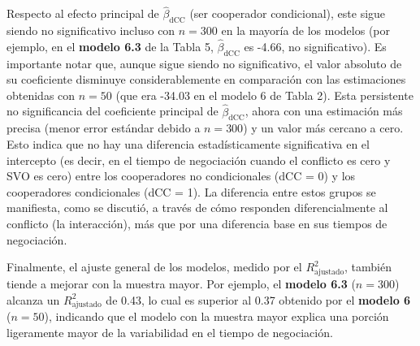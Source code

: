 \documentclass[
  spanish,
  10pt,
]{article}
\begin{document}
Respecto al efecto principal de \(\hat{\beta}_{\text{dCC}}\) (ser
cooperador condicional), este sigue siendo no significativo incluso con
\(n=300\) en la mayoría de los modelos (por ejemplo, en el
\textbf{modelo 6.3} de la Tabla 5, \(\hat{\beta}_{\text{dCC}}\) es
-4.66, no significativo). Es importante notar que, aunque sigue siendo
no significativo, el valor absoluto de su coeficiente disminuye
considerablemente en comparación con las estimaciones obtenidas con
\(n=50\) (que era -34.03 en el modelo 6 de Tabla 2). Esta persistente no
significancia del coeficiente principal de \(\hat{\beta}_{\text{dCC}}\),
ahora con una estimación más precisa (menor error estándar debido a
\(n=300\)) y un valor más cercano a cero. Esto indica que no hay una
diferencia estadísticamente significativa en el intercepto (es decir, en
el tiempo de negociación cuando el conflicto es cero y SVO es cero)
entre los cooperadores no condicionales (dCC = 0) y los cooperadores
condicionales (dCC = 1). La diferencia entre estos grupos se manifiesta,
como se discutió, a través de cómo responden diferencialmente al
conflicto (la interacción), más que por una diferencia base en sus
tiempos de negociación.

Finalmente, el ajuste general de los modelos, medido por el
\(R^2_{\text{ajustado}}\), también tiende a mejorar con la muestra
mayor. Por ejemplo, el \textbf{modelo 6.3} (\(n=300\)) alcanza un
\(R^2_{\text{ajustado}}\) de 0.43, lo cual es superior al 0.37 obtenido
por el \textbf{modelo 6} (\(n=50\)), indicando que el modelo con la
muestra mayor explica una porción ligeramente mayor de la variabilidad
en el tiempo de negociación.
\end{document}
